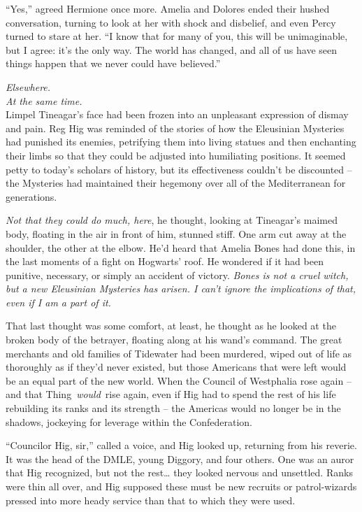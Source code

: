 ``Yes,'' agreed Hermione once more. Amelia and Dolores ended their
hushed conversation, turning to look at her with shock and disbelief,
and even Percy turned to stare at her. ``I know that for many of you,
this will be unimaginable, but I agree: it's the only way. The world has
changed, and all of us have seen things happen that we never could have
believed.''

\mybreak

\emph{Elsewhere.}\\
\emph{At the same time.}\\

Limpel Tineagar's face had been frozen into an unpleasant expression of
dismay and pain. Reg Hig was reminded of the stories of how the
Eleusinian Mysteries had punished its enemies, petrifying them into
living statues and then enchanting their limbs so that they could be
adjusted into humiliating positions. It seemed petty to today's scholars
of history, but its effectiveness couldn't be discounted -- the
Mysteries had maintained their hegemony over all of the Mediterranean
for generations.

\emph{Not that they could do much, here}, he thought, looking at
Tineagar's maimed body, floating in the air in front of him, stunned
stiff. One arm cut away at the shoulder, the other at the elbow. He'd
heard that Amelia Bones had done this, in the last moments of a fight on
Hogwarts' roof. He wondered if it had been punitive, necessary, or
simply an accident of victory. \emph{Bones is not a cruel witch, but a
new Eleusinian Mysteries has arisen. I can't ignore the implications of
that, even if I am a part of it.}

That last thought was some comfort, at least, he thought as he looked at
the broken body of the betrayer, floating along at his wand's command.
The great merchants and old families of Tidewater had been murdered,
wiped out of life as thoroughly as if they'd never existed, but those
Americans that were left would be an equal part of the new world. When
the Council of Westphalia rose again -- and that Thing~\emph{would}~rise
again, even if Hig had to spend the rest of his life rebuilding its
ranks and its strength -- the Americas would no longer be in the
shadows, jockeying for leverage within the Confederation.

``Councilor Hig, sir,'' called a voice, and Hig looked up, returning
from his reverie. It was the head of the DMLE, young Diggory, and four
others. One was an auror that Hig recognized, but not the rest\ldots{}
they looked nervous and unsettled. Ranks were thin all over, and Hig
supposed these must be new recruits or patrol-wizards pressed into more
heady service than that to which they were used.

